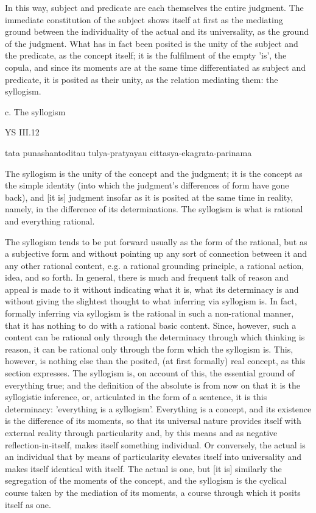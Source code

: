 In this way, subject and predicate are
each themselves the entire judgment.
The immediate constitution of the subject
shows itself at first as the mediating ground
between the individuality of the actual and its universality,
as the ground of the judgment.
What has in fact been posited is
the unity of the subject and the predicate,
as the concept itself;
it is the fulfilment of the empty 'is', the copula,
and since its moments are at the same time
differentiated as subject and predicate,
it is posited as their unity,
as the relation mediating them:
the syllogism.

c. The syllogism

YS III.12

tata punashantoditau tulya-pratyayau cittasya-ekagrata-parinama

The syllogism is the unity of the concept and the judgment;
it is the concept as the simple identity
(into which the judgment's differences of form have gone back),
and [it is] judgment insofar as it is
posited at the same time in reality,
namely, in the difference of its determinations.
The syllogism is what is rational and everything rational.

The syllogism tends to be put forward usually as the form of the rational,
but as a subjective form and without pointing up any sort
of connection between it and any other rational content, e.g. a
rational grounding principle, a rational action, idea, and so forth.
In general, there is much and frequent talk of reason and appeal is
made to it without indicating what it is, what its determinacy is and
without giving the slightest thought to what inferring via syllogism is.
In fact, formally inferring via syllogism is the rational in
such a non-rational manner, that it has nothing to do
with a rational basic content. Since, however, such a content can be
rational only through the determinacy through which thinking is
reason, it can be rational only through the form which the syllogism is.
This, however, is nothing else than the posited, (at first formally) real concept,
as this section expresses.
The syllogism is, on account of this, the essential ground of everything true;
and the definition of the absolute is from now on that it is the syllogistic inference,
or, articulated in the form of a sentence, it is this determinacy:
'everything is a syllogism'.
Everything is a concept, and its existence is the difference of its moments,
so that its universal nature provides itself with external reality
through particularity and, by this means and as negative reflection-in-itself,
makes itself something individual.
Or conversely, the actual is an individual that by means
of particularity elevates itself into universality and
makes itself identical with itself.
The actual is one, but [it is] similarly the segregation of
the moments of the concept, and
the syllogism is the cyclical course taken by the mediation of its moments,
a course through which it posits itself as one.

